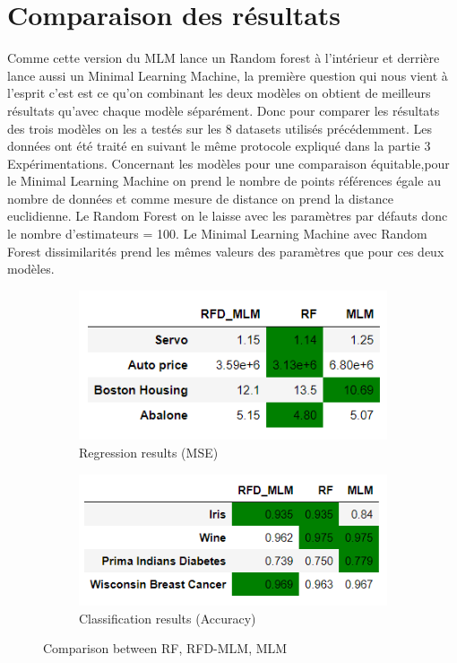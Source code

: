 \documentclass[12pt,a4paper]{report}
\begin{document}
{\color{MidnightBlue}\section{Comparaison des résultats }}
\par  Comme cette version du MLM lance un Random forest à l'intérieur et derrière lance aussi un Minimal Learning Machine, la première question qui nous vient à l'esprit c'est est ce qu'on combinant les deux modèles on obtient de meilleurs résultats qu'avec chaque modèle séparément. Donc pour comparer les résultats des trois modèles on les a testés sur les 8 datasets utilisés précédemment. Les données ont été traité en suivant le même protocole expliqué dans la partie 3 Expérimentations. Concernant les modèles pour une comparaison équitable,pour le Minimal Learning Machine on prend le nombre de points références égale au nombre de données et comme mesure de distance on prend la distance euclidienne. Le Random Forest on le laisse avec les paramètres par défauts donc le nombre d'estimateurs = 100. Le Minimal Learning Machine avec Random Forest dissimilarités prend les mêmes valeurs des paramètres que pour ces deux modèles.


\begin{figure}[!h]
    \centering
    \begin{subfigure}[b]{0.44\textwidth}
        \includegraphics[width=\textwidth]{rfd_regr.png}
         \caption{Regression results (MSE)}

    \end{subfigure}
    \begin{subfigure}[b]{0.46\textwidth}
        \includegraphics[width=\textwidth]{rfd_classif.png}
        \caption{Classification results (Accuracy)}
    \end{subfigure}
    \caption{Comparison between RF, RFD-MLM, MLM}
\end{figure}
\end{document}
